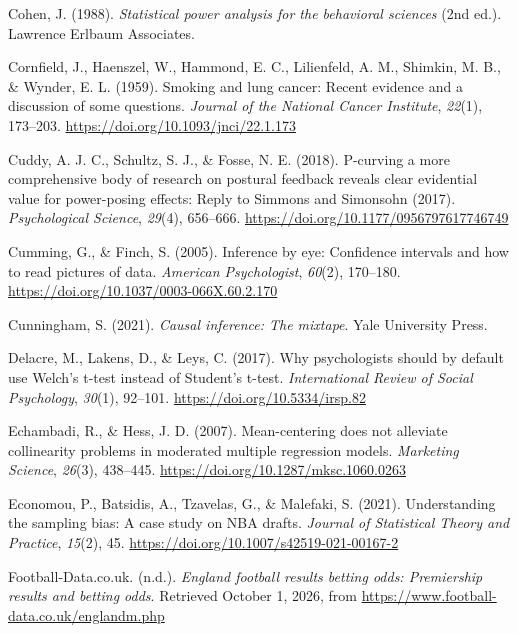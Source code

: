 \documentclass[
]{book}
\newlength{\cslhangindent}
\newenvironment{CSLReferences}[2] %
 {\begin{list}{}{%
  \setlength{\itemindent}{0pt}
  \setlength{\leftmargin}{0pt}
  \setlength{\parsep}{0pt}
  \ifodd #1
   \setlength{\leftmargin}{\cslhangindent}
   \setlength{\itemindent}{-1\cslhangindent}
  \fi
  \setlength{\itemsep}{#2\baselineskip}}}
 {\end{list}}
\begin{document}
\begin{CSLReferences}{1}{0}
Cohen, J. (1988). \emph{Statistical power analysis for the behavioral sciences} (2nd ed.). Lawrence Erlbaum Associates.

Cornfield, J., Haenszel, W., Hammond, E. C., Lilienfeld, A. M., Shimkin, M. B., \& Wynder, E. L. (1959). Smoking and lung cancer: Recent evidence and a discussion of some questions. \emph{Journal of the National Cancer Institute}, \emph{22}(1), 173--203. \url{https://doi.org/10.1093/jnci/22.1.173}

Cuddy, A. J. C., Schultz, S. J., \& Fosse, N. E. (2018). {P}-curving a more comprehensive body of research on postural feedback reveals clear evidential value for power-posing effects: Reply to {Simmons} and {Simonsohn} (2017). \emph{Psychological Science}, \emph{29}(4), 656--666. \url{https://doi.org/10.1177/0956797617746749}

Cumming, G., \& Finch, S. (2005). Inference by eye: Confidence intervals and how to read pictures of data. \emph{American Psychologist}, \emph{60}(2), 170--180. \url{https://doi.org/10.1037/0003-066X.60.2.170}

Cunningham, S. (2021). \emph{Causal inference: The mixtape}. Yale University Press.

Delacre, M., Lakens, D., \& Leys, C. (2017). Why psychologists should by default use {Welch's} t-test instead of {Student's} t-test. \emph{International Review of Social Psychology}, \emph{30}(1), 92--101. \url{https://doi.org/10.5334/irsp.82}

Echambadi, R., \& Hess, J. D. (2007). Mean-centering does not alleviate collinearity problems in moderated multiple regression models. \emph{Marketing Science}, \emph{26}(3), 438--445. \url{https://doi.org/10.1287/mksc.1060.0263}

Economou, P., Batsidis, A., Tzavelas, G., \& Malefaki, S. (2021). Understanding the sampling bias: A case study on {NBA} drafts. \emph{Journal of Statistical Theory and Practice}, \emph{15}(2), 45. \url{https://doi.org/10.1007/s42519-021-00167-2}

Football-Data.co.uk. (n.d.). \emph{{England} football results betting odds: Premiership results and betting odds}. Retrieved October 1, 2026, from \url{https://www.football-data.co.uk/englandm.php}


\end{CSLReferences}
\end{document}
